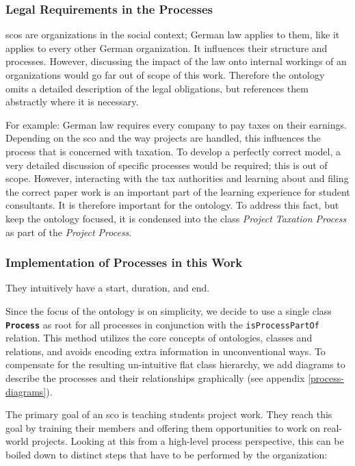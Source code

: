 \documentclass[a4paper, DIV=13, BCOR=0cm]{scrbook}
\newcommand{\class}[1]{\texttt{\textbf{#1}}}
\newcommand{\relation}[1]{\texttt{#1}}
\begin{document}
\subsubsection{Legal Requirements in the Processes }
\glspl{sco} are organizations in the social context; German law applies to them, like it applies to every other German organization. It influences their structure and processes. However, discussing the impact of the law onto internal workings of an organizations would go far out of scope of this work. Therefore the ontology omits a detailed description of the legal obligations, but references them abstractly where it is necessary.

For example: German law requires every company to pay taxes on their earnings. Depending on the \gls{sco} and the way projects are handled, this influences the process that is concerned with taxation. To develop a perfectly correct model, a very detailed discussion of specific processes would be required; this is out of scope. However, interacting with the tax authorities and learning about and filing the correct paper work is an important part of the learning experience for student consultants. It is therefore important for the ontology. To address this fact, but keep the ontology focused, it is condensed into the class \textit{Project Taxation Process} as part of the \textit{Project Process}.


\subsubsection{Implementation of Processes in this Work }
They intuitively have a start, duration, and end.

Since the focus of the ontology is on simplicity, we decide to use a single  class \class{Process} as root for all processes in conjunction with the \relation{isProcessPartOf} relation. This method utilizes the core concepts of ontologies, classes and relations, and avoids encoding extra information in unconventional ways. To compensate for the resulting un-intuitive flat class hierarchy, we add diagrams to describe the processes and their relationships graphically (see appendix \ref{process-diagrams}).

The primary goal of an \gls{sco} is teaching students project work. They reach this goal by training their members and offering them opportunities to work on real-world projects. Looking at this from a high-level process perspective, this can be boiled down to distinct steps that have to be performed by the organization:
\end{document}
